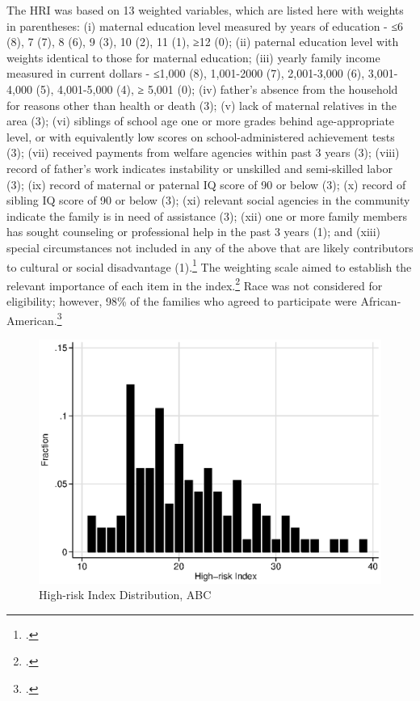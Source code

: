 \begin{appendices}
\noindent The HRI was based on 13 weighted variables, which are listed here with weights in parentheses: (i) maternal education level measured by years of education - ≤6 (8), 7 (7), 8 (6), 9 (3), 10 (2), 11 (1), ≥12 (0); (ii) paternal education level with weights identical to those for maternal education; (iii) yearly family income measured in current dollars - ≤1,000 (8), 1,001-2000 (7), 2,001-3,000 (6), 3,001-4,000 (5), 4,001-5,000 (4), ≥ 5,001 (0); (iv) father's absence from the household for reasons other than health or death (3); (v) lack of maternal relatives in the area (3); (vi) siblings of school age one or more grades behind age-appropriate level, or with equivalently low scores on school-administered achievement tests (3); (vii) received payments from welfare agencies within past 3 years (3); (viii) record of father's work indicates instability or unskilled and semi-skilled labor (3); (ix) record of maternal or paternal IQ score of 90 or below (3); (x) record of sibling IQ score of 90 or below (3); (xi) relevant social agencies in the community indicate the family is in need of assistance (3); (xii) one or more family members has sought counseling or professional help in the past 3 years (1); and (xiii) special circumstances not included in any of the above that are likely contributors to cultural or social disadvantage (1).\footnote{\citet{Ramey_Smith_1977_AJMD, Ramey_Campbell_1984_AJMD,Ramey_Campbell_1991_childreninpoverty,Ramey_Campbell_etal_2000_ADS}.} The weighting scale aimed to establish the relevant importance of each item in the index.\footnote{\citet{Ramey_Smith_1977_AJMD}.} Race was not  considered for eligibility; however, 98\% of the families who agreed to participate were African-American.\footnote{\citet{Ramey_Smith_1977_AJMD,Ramey_Campbell_1979_SR}.} \\

\begin{center}
	\begin{figure}[H]
		\caption{High-risk Index Distribution, ABC} \label{figure:hridistabc}
		\centering
		\includegraphics[width=.9\columnwidth]{output/abc_hri.eps}
	\end{figure}
\end{center}


\end{appendices}
